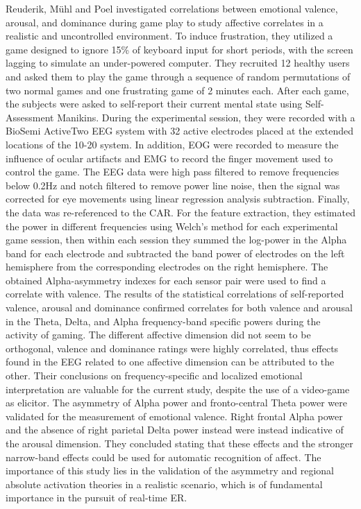 Reuderik, Mühl and Poel \cite{reuderink_valence_2013} investigated correlations between emotional valence, arousal, and dominance during game play to study affective correlates in a realistic and uncontrolled environment. To induce frustration, they utilized a game designed to ignore 15\% of keyboard input for short periods, with the screen lagging to simulate an under-powered computer. They recruited 12 healthy users and asked them to play the game through a sequence of random permutations of two normal games and one frustrating game of 2 minutes each. After each game, the subjects were asked to self-report their current mental state using Self-Assessment Manikins. During the experimental session, they were recorded with a BioSemi ActiveTwo EEG system with 32 active electrodes placed at the extended locations of the 10-20 system. In addition, \ac{EOG} were recorded to measure the influence of ocular artifacts and \ac{EMG} to record the finger movement used to control the game. The \ac{EEG} data were high pass filtered to remove frequencies below 0.2Hz and notch filtered to remove power line noise, then the signal was corrected for eye movements using linear regression analysis subtraction. Finally, the data was re-referenced to the \ac{CAR}. For the feature extraction, they estimated the power in different frequencies using Welch’s method for each experimental game session, then within each session they summed the log-power in the Alpha band for each electrode and subtracted the band power of electrodes on the left hemisphere from the corresponding electrodes on the right hemisphere. The obtained Alpha-asymmetry indexes for each sensor pair were used to find a correlate with valence. The results of the statistical correlations of self-reported valence, arousal and dominance confirmed correlates for both valence and arousal in the Theta, Delta, and Alpha frequency-band specific powers during the activity of gaming. The different affective dimension did not seem to be orthogonal, valence and dominance ratings were highly correlated, thus effects found in the \ac{EEG} related to one affective dimension can be attributed to the other. Their conclusions on frequency-specific and localized emotional interpretation are valuable for the current study, despite the use of a video-game as elicitor. The asymmetry of Alpha power and fronto-central Theta power were validated for the measurement of emotional valence. Right frontal Alpha power and the absence of right parietal Delta power instead were instead indicative of the arousal dimension. They concluded stating that these effects and the stronger narrow-band effects could be used for automatic recognition of affect. The importance of this study lies in the validation of the asymmetry and regional absolute activation theories in a realistic scenario, which is of fundamental importance in the pursuit of real-time \ac{ER}.
